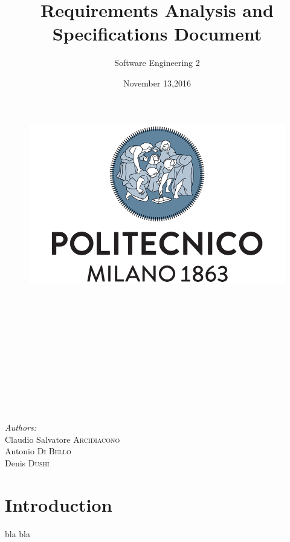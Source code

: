 \documentclass[a4paper]{article}
\title{Requirements Analysis and Specifications Document}
\author{Software Engineering 2}
\date{November 13,2016}
\begin{document}
\maketitle

\begin{figure}[h]
  \centering
  \includegraphics[width=300 pt]{resources/polimi.png}
  \label{fig:polimi}
\end{figure}

\emph{\\}
\emph{\\}
\emph{\\}
\emph{\\}
\emph{\\}
\emph{\\}
\emph{\\}
\emph{\\}
\emph{\\}
\emph{\\}

\begin{minipage}{0.4\textwidth}
\begin{flushleft} \large
\emph{Authors:}\\
Claudio Salvatore \textsc{Arcidiacono}\\
Antonio \textsc{Di Bello}\\
Denis \textsc{Dushi}
\end{flushleft}
\end{minipage}

\begin{minipage}{0.4\textwidth}

\end{minipage}

\newpage
{}

\tableofcontents

\newpage

\section{Introduction}
bla bla
\end{document}
